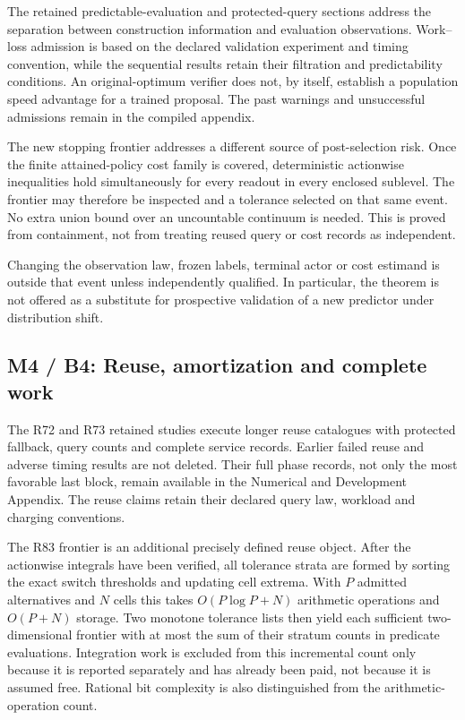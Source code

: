 The retained predictable-evaluation and protected-query sections address
the separation between construction information and evaluation
observations. Work--loss admission is based on the declared validation
experiment and timing convention, while the sequential results retain
their filtration and predictability conditions. An original-optimum
verifier does not, by itself, establish a population speed advantage for
a trained proposal. The past warnings and unsuccessful admissions remain
in the compiled appendix.

The new stopping frontier addresses a different source of post-selection
risk. Once the finite attained-policy cost family is covered,
deterministic actionwise inequalities hold simultaneously for every
readout in every enclosed sublevel. The frontier may therefore be
inspected and a tolerance selected on that same event. No extra union
bound over an uncountable continuum is needed. This is proved from
containment, not from treating reused query or cost records as
independent.

Changing the observation law, frozen labels, terminal actor or cost
estimand is outside that event unless independently qualified. In
particular, the theorem is not offered as a substitute for prospective
validation of a new predictor under distribution shift.

\hypertarget{m4-b4-reuse-amortization-and-complete-work}{%
\subsection{M4 / B4: Reuse, amortization and complete
work}\label{m4-b4-reuse-amortization-and-complete-work}}

The R72 and R73 retained studies execute longer reuse catalogues with
protected fallback, query counts and complete service records. Earlier
failed reuse and adverse timing results are not deleted. Their full
phase records, not only the most favorable last block, remain available
in the Numerical and Development Appendix. The reuse claims retain their
declared query law, workload and charging conventions.

The R83 frontier is an additional precisely defined reuse object. After
the actionwise integrals have been verified, all tolerance strata are
formed by sorting the exact switch thresholds and updating cell extrema.
With \(P\) admitted alternatives and \(N\) cells this takes
\(O(P\log P+N)\) arithmetic operations and \(O(P+N)\) storage. Two
monotone tolerance lists then yield each sufficient two-dimensional
frontier with at most the sum of their stratum counts in predicate
evaluations. Integration work is excluded from this incremental count
only because it is reported separately and has already been paid, not
because it is assumed free. Rational bit complexity is also
distinguished from the arithmetic-operation count.

